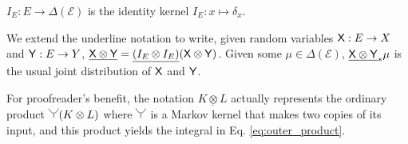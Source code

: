$I_E:E\to \Delta(\mathcal{E})$ is the identity kernel $I_E:x\mapsto \delta_x$.

We extend the underline notation to write, given random variables $\mathsf{X}:E\to X$ and $\mathsf{Y}:E\to Y$, $\underline{\mathsf{X}\otimes\mathsf{Y}}=\underline{(I_E\otimes I_E)}(\mathsf{X}\otimes \mathsf{Y})$. Given some $\mu\in \Delta(\mathcal{E})$, $\underline{\mathsf{X}\otimes\mathsf{Y}}_*\mu$ is the usual joint distribution of $\mathsf{X}$ and $\mathsf{Y}$.

For proofreader's benefit, the notation $\underline{K\otimes L}$ actually represents the ordinary product $\splitter{0.15}(K\otimes L)$ where $\splitter{0.15}$ is a Markov kernel that makes two copies of its input, and this product yields the integral in Eq. \ref{eq:outer_product}.